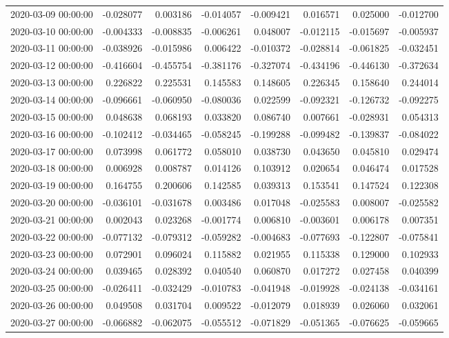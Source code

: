 \begin{tabular}{lrrrrrrr}
2020-03-09 00:00:00 & -0.028077 & 0.003186 & -0.014057 & -0.009421 & 0.016571 & 0.025000 & -0.012700 \\
2020-03-10 00:00:00 & -0.004333 & -0.008835 & -0.006261 & 0.048007 & -0.012115 & -0.015697 & -0.005937 \\
2020-03-11 00:00:00 & -0.038926 & -0.015986 & 0.006422 & -0.010372 & -0.028814 & -0.061825 & -0.032451 \\
2020-03-12 00:00:00 & -0.416604 & -0.455754 & -0.381176 & -0.327074 & -0.434196 & -0.446130 & -0.372634 \\
2020-03-13 00:00:00 & 0.226822 & 0.225531 & 0.145583 & 0.148605 & 0.226345 & 0.158640 & 0.244014 \\
2020-03-14 00:00:00 & -0.096661 & -0.060950 & -0.080036 & 0.022599 & -0.092321 & -0.126732 & -0.092275 \\
2020-03-15 00:00:00 & 0.048638 & 0.068193 & 0.033820 & 0.086740 & 0.007661 & -0.028931 & 0.054313 \\
2020-03-16 00:00:00 & -0.102412 & -0.034465 & -0.058245 & -0.199288 & -0.099482 & -0.139837 & -0.084022 \\
2020-03-17 00:00:00 & 0.073998 & 0.061772 & 0.058010 & 0.038730 & 0.043650 & 0.045810 & 0.029474 \\
2020-03-18 00:00:00 & 0.006928 & 0.008787 & 0.014126 & 0.103912 & 0.020654 & 0.046474 & 0.017528 \\
2020-03-19 00:00:00 & 0.164755 & 0.200606 & 0.142585 & 0.039313 & 0.153541 & 0.147524 & 0.122308 \\
2020-03-20 00:00:00 & -0.036101 & -0.031678 & 0.003486 & 0.017048 & -0.025583 & 0.008007 & -0.025582 \\
2020-03-21 00:00:00 & 0.002043 & 0.023268 & -0.001774 & 0.006810 & -0.003601 & 0.006178 & 0.007351 \\
2020-03-22 00:00:00 & -0.077132 & -0.079312 & -0.059282 & -0.004683 & -0.077693 & -0.122807 & -0.075841 \\
2020-03-23 00:00:00 & 0.072901 & 0.096024 & 0.115882 & 0.021955 & 0.115338 & 0.129000 & 0.102933 \\
2020-03-24 00:00:00 & 0.039465 & 0.028392 & 0.040540 & 0.060870 & 0.017272 & 0.027458 & 0.040399 \\
2020-03-25 00:00:00 & -0.026411 & -0.032429 & -0.010783 & -0.041948 & -0.019928 & -0.024138 & -0.034161 \\
2020-03-26 00:00:00 & 0.049508 & 0.031704 & 0.009522 & -0.012079 & 0.018939 & 0.026060 & 0.032061 \\
2020-03-27 00:00:00 & -0.066882 & -0.062075 & -0.055512 & -0.071829 & -0.051365 & -0.076625 & -0.059665 \\

\end{tabular}
